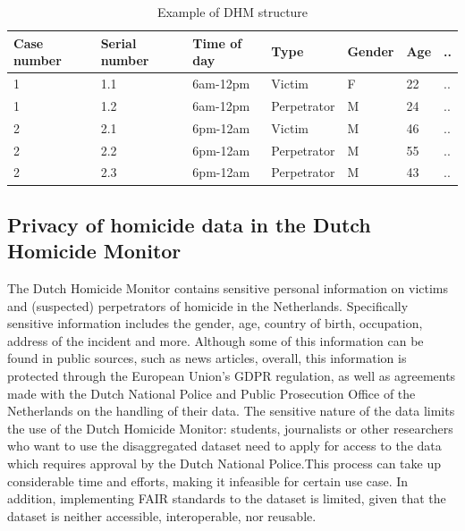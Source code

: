 \vspace{10pt}
\begin{table}[H]
\small
\centering
\begin{tabular}{@{}lllllll@{}}
\toprule
Case number & Serial number & Time of day & Type        & Gender & Age & .. \\ \midrule
1           & 1.1           & 6am-12pm    & Victim      & F      & 22  & .. \\
1           & 1.2           & 6am-12pm    & Perpetrator & M      & 24  & .. \\
2           & 2.1           & 6pm-12am    & Victim      & M      & 46  & .. \\
2           & 2.2           & 6pm-12am    & Perpetrator & M      & 55  & .. \\
2           & 2.3           & 6pm-12am    & Perpetrator & M      & 43  & .. \\ \bottomrule
\end{tabular}
\caption{Example of DHM structure}
\label{tab:my-table}
\end{table}
\vspace{10pt}

\subsection{Privacy of homicide data in the Dutch Homicide Monitor}
The Dutch Homicide Monitor contains sensitive personal information on victims and (suspected) perpetrators of homicide in the Netherlands. Specifically sensitive information includes the gender, age, country of birth, occupation, address of the incident and more. Although some of this information can be found in public sources, such as news articles, overall, this information is protected through the European Union's GDPR regulation, as well as agreements made with the Dutch National Police and Public Prosecution Office of the Netherlands on the handling of their data. The sensitive nature of the data limits the use of the Dutch Homicide Monitor: students, journalists or other researchers who want to use the disaggregated dataset need to apply for access to the data which requires approval by the Dutch National Police.This process can take up considerable time and efforts, making it infeasible for certain use case. In addition, implementing FAIR standards to the dataset is limited, given that the dataset is neither accessible, interoperable, nor reusable. 


